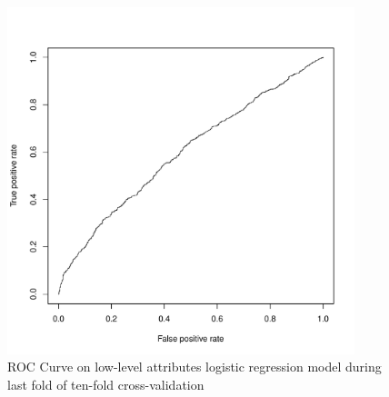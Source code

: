 \documentclass[11pt]{article}
\begin{document}
\begin{figure}[H]
  \centering
    \includegraphics[width=0.9\textwidth]{t3/roc_low}
    \caption{ROC Curve on low-level attributes logistic regression model during last fold of ten-fold cross-validation}
    \label{fig:t3_roc_low}
\end{figure}
\end{document}
